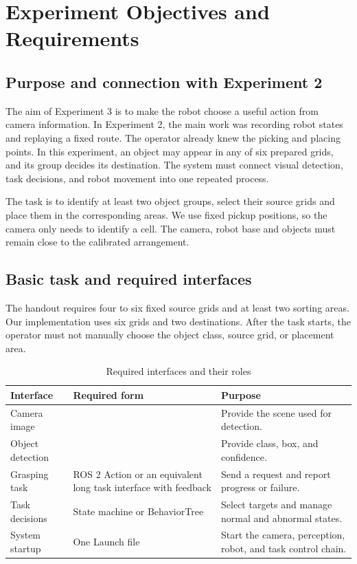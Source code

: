 \section{Experiment Objectives and Requirements}
\subsection{Purpose and connection with Experiment 2}
The aim of Experiment 3 is to make the robot choose a useful action from camera information. In Experiment 2, the main work was recording robot states and replaying a fixed route. The operator already knew the picking and placing points. In this experiment, an object may appear in any of six prepared grids, and its group decides its destination. The system must connect visual detection, task decisions, and robot movement into one repeated process.

The task is to identify at least two object groups, select their source grids and place them in the corresponding areas. We use fixed pickup positions, so the camera only needs to identify a cell. The camera, robot base and objects must remain close to the calibrated arrangement.

\subsection{Basic task and required interfaces}
The handout requires four to six fixed source grids and at least two sorting areas. Our implementation uses six grids and two destinations. After the task starts, the operator must not manually choose the object class, source grid, or placement area.

\begin{table}[H]\tabstart
\caption{Required interfaces and their roles}
\begin{tabularx}{\textwidth}{@{}L{3.0cm}L{5.0cm}Y@{}}
\toprule Interface & Required form & Purpose\\\midrule
Camera image &  & Provide the scene used for detection.\\
Object detection &  & Provide class, box, and confidence.\\
Grasping task & ROS 2 Action or an equivalent long task interface with feedback & Send a request and report progress or failure.\\
Task decisions & State machine or BehaviorTree & Select targets and manage normal and abnormal states.\\
System startup & One Launch file & Start the camera, perception, robot, and task control chain.\\
\bottomrule
\end{tabularx}
\end{table}

